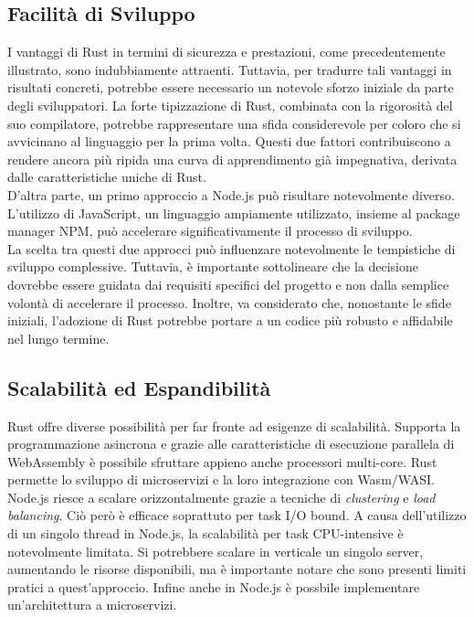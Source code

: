 \subsection{Facilità di Sviluppo}
I vantaggi di Rust in termini di sicurezza e prestazioni, come precedentemente illustrato, sono indubbiamente attraenti. Tuttavia, per tradurre tali vantaggi in risultati concreti, potrebbe essere necessario un notevole sforzo iniziale da parte degli sviluppatori. La forte tipizzazione di Rust, combinata con la rigorosità del suo compilatore, potrebbe rappresentare una sfida considerevole per coloro che si avvicinano al linguaggio per la prima volta. Questi due fattori contribuiscono a rendere ancora più ripida una curva di apprendimento già impegnativa, derivata dalle caratteristiche uniche di Rust.
\\D'altra parte, un primo approccio a Node.js può risultare notevolmente diverso. L'utilizzo di JavaScript, un linguaggio ampiamente utilizzato, insieme al package manager NPM, può accelerare significativamente il processo di sviluppo.
\\La scelta tra questi due approcci può influenzare notevolmente le tempistiche di sviluppo complessive. Tuttavia, è importante sottolineare che la decisione dovrebbe essere guidata dai requisiti specifici del progetto e non dalla semplice volontà di accelerare il processo. Inoltre, va considerato che, nonostante le sfide iniziali, l'adozione di Rust potrebbe portare a un codice più robusto e affidabile nel lungo termine.
\subsection{Scalabilità ed Espandibilità}
Rust offre diverse possibilità per far fronte ad esigenze di scalabilità. 
Supporta la programmazione asincrona e grazie alle caratteristiche di esecuzione parallela di WebAssembly è possibile sfruttare appieno anche processori multi-core.
Rust permette lo sviluppo di microservizi e la loro integrazione con Wasm/WASI.
\\Node.js riesce a scalare orizzontalmente grazie a tecniche di \emph{clustering} e \emph{load balancing}.
Ciò però è efficace soprattuto per task I/O bound.
A causa dell'utilizzo di un singolo thread in Node.js, la scalabilità per task CPU-intensive è notevolmente limitata.
Si potrebbere scalare in verticale un singolo server, aumentando le risorse disponibili, ma è importante notare che sono presenti limiti pratici a quest'approccio.
Infine anche in Node.js è possbile implementare un'architettura a microservizi.
